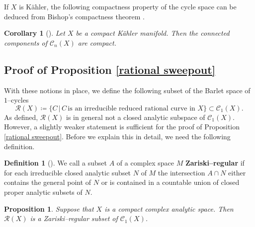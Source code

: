 \documentclass[11pt,a4paper]{article}
\newtheorem{prop}[theorem]{Proposition}
\newtheorem{cor}[theorem]{Corollary}
\theoremstyle{definition}
\newtheorem{definition}[theorem]{Definition}
\newcommand{\cC}{\mathcal{C}}
\newcommand{\cR}{\mathcal{R}}
\begin{document}
If $X$ is K\"ahler, the following compactness property of the cycle space can be deduced from Bishop's compactness theorem \cite[Theorem 1]{Bishop1964}.

\begin{cor}[{\cite[Corollary 4.2.76]{BarletMagnusson2019CyclesI}}]\label{compactness property}
  Let $X$ be a compact K\"ahler manifold. Then the connected components of $\cC_n(X)$ are compact.
\end{cor}

\subsection{Proof of Proposition \ref{rational sweepout}}

With these notions in place, we define the following subset of the Barlet space of $1$--cycles
\begin{equation*}
  \cR(X) \coloneq \big\{ C \, \big|\, C\, \text{is an irreducible reduced rational curve in }X \big\} \subset \cC_1(X).
\end{equation*}
As defined, $\cR(X)$ is in general not a closed analytic subspace of $\cC_1(X)$. However, a slightly weaker statement is sufficient for the proof of Proposition \ref{rational sweepout}. Before we explain this in detail, we need the following definition.

\begin{definition}[{\cite[Definition 2.1]{Campana2004Appendix}}]
   We call a subset $A$ of a complex space $M$ \textbf{Zariski--regular} if for each irreducible closed analytic subset $N$ of $M$ the intersection $A \cap N$ either contains the general point of $N$ or is contained in a countable union of closed proper analytic subsets of $N$.
\end{definition}

\begin{prop}
  Suppose that $X$ is a compact complex analytic space. Then $\cR(X)$ is a Zariski--regular subset of $\cC_1(X)$. 
\end{prop}
\end{document}
